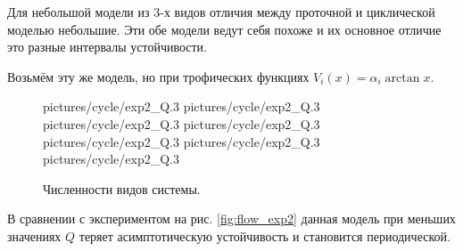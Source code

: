 Для небольшой модели из \(3\)-х видов отличия между проточной и циклической моделью небольшие. Эти обе модели ведут себя похоже и их основное отличие это разные интервалы устойчивости. 

Возьмём эту же модель, но при трофических функциях \( V_i(x) = \alpha_i \arctan x \).

\begin{figure}[H]
    \centering
     {pictures/cycle/exp2_Q}{.3}
      {pictures/cycle/exp2_Q}{.3}
      {pictures/cycle/exp2_Q}{.3}
      {pictures/cycle/exp2_Q}{.3}
      {pictures/cycle/exp2_Q}{.3}
      {pictures/cycle/exp2_Q}{.3}
     {pictures/cycle/exp2_Q}{.3}
\caption{Численности видов системы.}  \label{fig:cycle_exp2}
\end{figure}

В сравнении с экспериментом на рис. \ref{fig:flow_exp2} данная модель при меньших значениях \(Q\) теряет асимптотическую устойчивость и становится периодической. 